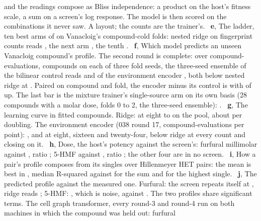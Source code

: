 and the readings compose as Bliss independence: a product on the host's fitness scale, a
sum on a screen's log response. The model is then scored on the \hydnCombinations{}
combinations it never saw. A layout; the counts are the trainer's.
\,
\textbf{e}, The ladder, ten best arms of \hydladderNArms{} on Vanacloig's compound-cold
folds: nested ridge on fingerprint counts reads \hydladderRidge{}, the next arm
\hydladderSecond{}, the tenth \hydladderTenth{}. \,
\textbf{f}, Which model predicts an unseen Vanacloig compound's profile. The second
round is complete: over \hydbilinearEvaluations{} compound-evaluations,
\hydenvencCompounds{} compounds on each of three fold seeds, the three-seed ensemble of
the bilinear control reads \hydbilinearMedian{} and of the environment encoder
\hydenvencMedian{}, both below nested ridge at \hydladderRidge{}. Paired on compound and
fold, the encoder minus its control is \hydpairedMedian{} with \hydpairedUp{} of
\hydpairedEvaluations{} up. The last bar is the mixture trainer's single-source arm on
its own basis (28 compounds with a molar dose, folds 0 to 2, the three-seed ensemble):
\hydmixVanEnsemble{}. \,
\textbf{g}, The learning curve in fitted compounds. Ridge: \hydcurveEight{} at eight to
\hydcurvePool{} on the pool, about \hydcurvePerDoubling{} per doubling. The environment
encoder (038 round 17, \hydcurveEncEvaluations{} compound-evaluations per point):
\hydcurveEncEight{}, \hydcurveEncOneSix{} and \hydcurveEncTwoFour{} at eight, sixteen
and twenty-four, below ridge at every count and closing on it.
\,
\textbf{h}, Dose, the host's potency against the screen's: furfural
\hydicThirtyFf{} millimolar against \hydvanacloigFf{}, ratio \hydratioFf{}; 5-HMF
\hydicThirtyHmf{} against \hydvanacloigHmf{}, ratio \hydratioHmf{}; the other four are in
no screen. \,
\textbf{i}, How a pair's profile composes from its singles over \hydhetPairs{}
Hillenmeyer HET pairs: the mean is best in \hydhetMeanWins{}, median R-squared
\hydhetrTwomean{} against \hydhetrTwosum{} for the sum and \hydhetrTwomax{} for the
highest single. \,
\textbf{j}, The predicted profile against the measured one. Furfural: the screen repeats
itself at \hydprofFfReliability{}, ridge reads \hydprofFfRidge{}; 5-HMF:
\hydprofHmfReliability{}, which is noise, against \hydprofHmfRidge{}. The two profiles
share \hydgoSharedTermsStore{} significant terms. The cell graph transformer, every
round-3 and round-4 run on both machines in which the compound was held out: furfural
